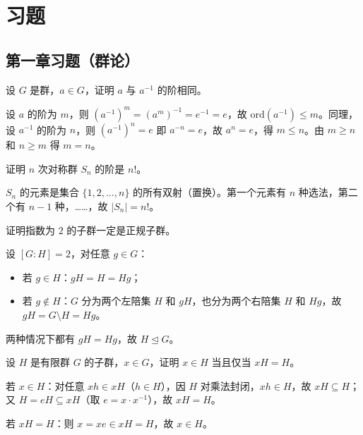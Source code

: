 \chapter{习题}

\section{第一章习题（群论）}

\begin{homework}
设 $G$ 是群，$a \in G$，证明 $a$ 与 $a^{-1}$ 的阶相同。

\begin{solution}
设 $a$ 的阶为 $m$，则 $(a^{-1})^m = (a^m)^{-1} = e^{-1} = e$，故 $\mathrm{ord}(a^{-1}) \le m$。同理，设 $a^{-1}$ 的阶为 $n$，则 $(a^{-1})^n = e$ 即 $a^{-n} = e$，故 $a^n = e$，得 $m \le n$。由 $m \ge n$ 和 $n \ge m$ 得 $m = n$。
\end{solution}
\end{homework}

\begin{homework}
证明 $n$ 次对称群 $S_n$ 的阶是 $n!$。

\begin{solution}
$S_n$ 的元素是集合 $\{1, 2, \ldots, n\}$ 的所有双射（置换）。第一个元素有 $n$ 种选法，第二个有 $n-1$ 种，……，故 $|S_n| = n!$。
\end{solution}
\end{homework}

\begin{homework}
证明指数为 $2$ 的子群一定是正规子群。

\begin{solution}
设 $[G:H] = 2$，对任意 $g \in G$：
\begin{itemize}
  \item 若 $g \in H$：$gH = H = Hg$；
  \item 若 $g \notin H$：$G$ 分为两个左陪集 $H$ 和 $gH$，也分为两个右陪集 $H$ 和 $Hg$，故 $gH = G \setminus H = Hg$。
\end{itemize}
两种情况下都有 $gH = Hg$，故 $H \trianglelefteq G$。
\end{solution}
\end{homework}

\begin{homework}
设 $H$ 是有限群 $G$ 的子群，$x \in G$，证明 $x \in H$ 当且仅当 $xH = H$。

\begin{solution}
若 $x \in H$：对任意 $xh \in xH$（$h \in H$），因 $H$ 对乘法封闭，$xh \in H$，故 $xH \subseteq H$；又 $H = eH \subseteq xH$（取 $e = x \cdot x^{-1}$），故 $xH = H$。

若 $xH = H$：则 $x = xe \in xH = H$，故 $x \in H$。
\end{solution}
\end{homework}

